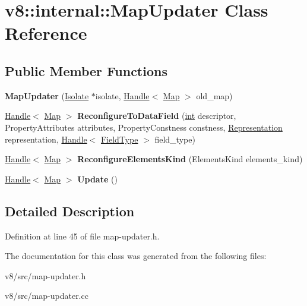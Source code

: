 \hypertarget{classv8_1_1internal_1_1MapUpdater}{}\section{v8\+:\+:internal\+:\+:Map\+Updater Class Reference}
\label{classv8_1_1internal_1_1MapUpdater}
\subsection*{Public Member Functions}
\begin{DoxyCompactItemize}
\item 
\mbox{\label{classv8_1_1internal_1_1MapUpdater_ae9b27ee9a9387da8cfe568ee414fdfba}} 
{\bfseries Map\+Updater} (\mbox{\hyperlink{classv8_1_1internal_1_1Isolate}{Isolate}} $\ast$isolate, \mbox{\hyperlink{classv8_1_1internal_1_1Handle}{Handle}}$<$ \mbox{\hyperlink{classv8_1_1internal_1_1Map}{Map}} $>$ old\+\_\+map)
\item 
\mbox{\label{classv8_1_1internal_1_1MapUpdater_a1b5d309360d2c134348e9439ad3da51d}} 
\mbox{\hyperlink{classv8_1_1internal_1_1Handle}{Handle}}$<$ \mbox{\hyperlink{classv8_1_1internal_1_1Map}{Map}} $>$ {\bfseries Reconfigure\+To\+Data\+Field} (\mbox{\hyperlink{classint}{int}} descriptor, Property\+Attributes attributes, Property\+Constness constness, \mbox{\hyperlink{classv8_1_1internal_1_1Representation}{Representation}} representation, \mbox{\hyperlink{classv8_1_1internal_1_1Handle}{Handle}}$<$ \mbox{\hyperlink{classv8_1_1internal_1_1FieldType}{Field\+Type}} $>$ field\+\_\+type)
\item 
\mbox{\label{classv8_1_1internal_1_1MapUpdater_a484aea5ba3eabca6a01a0542e7c6206b}} 
\mbox{\hyperlink{classv8_1_1internal_1_1Handle}{Handle}}$<$ \mbox{\hyperlink{classv8_1_1internal_1_1Map}{Map}} $>$ {\bfseries Reconfigure\+Elements\+Kind} (Elements\+Kind elements\+\_\+kind)
\item 
\mbox{\label{classv8_1_1internal_1_1MapUpdater_ad9af4bdcc4d58fa609e0156c89ae483d}} 
\mbox{\hyperlink{classv8_1_1internal_1_1Handle}{Handle}}$<$ \mbox{\hyperlink{classv8_1_1internal_1_1Map}{Map}} $>$ {\bfseries Update} ()
\end{DoxyCompactItemize}


\subsection{Detailed Description}


Definition at line 45 of file map-\/updater.\+h.



The documentation for this class was generated from the following files\+:\begin{DoxyCompactItemize}
\item 
v8/src/map-\/updater.\+h\item 
v8/src/map-\/updater.\+cc\end{DoxyCompactItemize}
